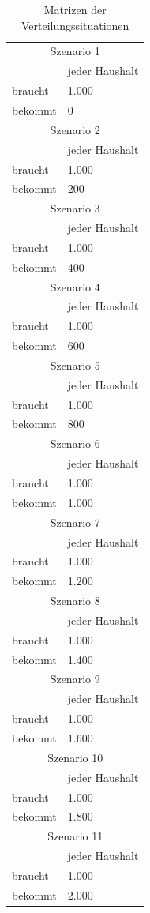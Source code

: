 \documentclass[a4paper]{thesis}
\begin{document}
\begin{table}[H]
\centering
\caption{Matrizen der Verteilungssituationen}
\label{Matrizen der Verteilungssituationen}
\begin{tabular}{l|l}
\multicolumn{2}{c}{Szenario 1}\\
& jeder Haushalt\\
\hline
braucht & 1.000\\
bekommt & 0\\
\hline
\multicolumn{2}{c}{Szenario 2}\\
& jeder Haushalt\\
\hline
braucht & 1.000\\
bekommt & 200\\
\hline
\multicolumn{2}{c}{Szenario 3}\\
& jeder Haushalt\\
\hline
braucht & 1.000\\
bekommt & 400\\
\hline
\multicolumn{2}{c}{Szenario 4}\\
& jeder Haushalt\\
\hline
braucht & 1.000\\
bekommt & 600\\
\hline
\multicolumn{2}{c}{Szenario 5}\\
& jeder Haushalt\\
\hline
braucht & 1.000\\
bekommt & 800\\
\hline
\multicolumn{2}{c}{Szenario 6}\\
& jeder Haushalt\\
\hline
braucht & 1.000\\
bekommt & 1.000\\
\hline
\multicolumn{2}{c}{Szenario 7}\\
& jeder Haushalt\\
\hline
braucht & 1.000\\
bekommt & 1.200\\
\hline
\multicolumn{2}{c}{Szenario 8}\\
& jeder Haushalt\\
\hline
braucht & 1.000\\
bekommt & 1.400\\
\hline
\multicolumn{2}{c}{Szenario 9}\\
& jeder Haushalt\\
\hline
braucht & 1.000\\
bekommt & 1.600\\
\hline
\multicolumn{2}{c}{Szenario 10}\\
& jeder Haushalt\\
\hline
braucht & 1.000\\
bekommt & 1.800\\
\hline
\multicolumn{2}{c}{Szenario 11}\\
& jeder Haushalt\\
\hline
braucht & 1.000\\
bekommt & 2.000
\end{tabular}
\end{table}
\end{document}
